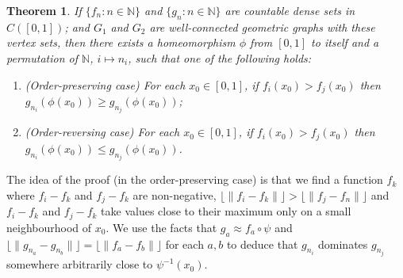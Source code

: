 \documentclass{daj}
\newtheorem{thm}{Theorem}
\newcommand{\N}{\mathbb N}
\begin{document}
\begin{thm}\label{thm:radovrado}
If $\{f_n\colon n\in\N\}$ and $\{g_n\colon n\in\N\}$ are countable dense sets in
$C([0,1])$; and $G_1$ and $G_2$ are well-connected geometric graphs
with these vertex sets, then there exists a homeomorphism $\phi$ from $[0,1]$
to itself and a permutation of $\N$, $i\mapsto n_i$, such that one of the following holds:
\begin{enumerate}
\item
(Order-preserving case)
For each $x_0\in [0,1]$,
if $f_{i}(x_0)> f_{j}(x_0)$ then $g_{n_i}(\phi(x_0))\ge g_{n_j}(\phi(x_0))$;
\item
(Order-reversing case)
For each $x_0\in [0,1]$, if $f_{i}(x_0)> f_j(x_0)$ then $g_{n_i}(\phi(x_0))\le g_{n_j}(\phi(x_0))$.
\end{enumerate}
\end{thm}

The idea of the proof (in the order-preserving case)
is that we find a function $f_k$ where $f_i-f_k$ and $f_j-f_k$ are non-negative,
$\lfloor \|f_i-f_k\|\rfloor>\lfloor \|f_j-f_n\|\rfloor$ and $f_i-f_k$ and $f_j-f_k$ take values close to their
maximum only on a small neighbourhood of $x_0$. We use the facts that
$g_a\approx f_a\circ\psi$ and $\lfloor \|g_{n_a}-g_{n_b}\|\rfloor=\lfloor \|f_a-f_b\|
\rfloor$ for each $a,b$ to deduce that $g_{n_i}$ dominates $g_{n_j}$ somewhere
arbitrarily close to $\psi^{-1}(x_0)$.
\end{document}
